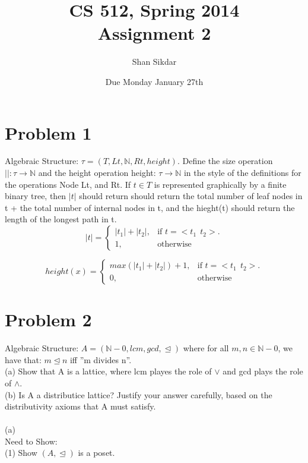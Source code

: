 \documentclass[11pt,leqno,fleqn]{article}
\title{CS 512, Spring 2014
       \\[1ex]
       \textbf{Assignment 2}}
\author{Shan Sikdar}
\date{Due Monday January 27th} %
\begin{document}
\maketitle

\section{Problem 1 }

Algebraic Structure: $\tau = (T, Lt,  \mathbb{N}, Rt, height) $. Define the size operation $|| : \tau \to \mathbb{N} $ and the height operation height: $\tau \to \mathbb{N}$ in the style of the definitions for the operations Node Lt, and Rt.
 If $ t \in T$ is represented graphically by a finite binary tree, then $|t|$ should return should return the total number of leaf nodes in t + the total number of internal nodes in t, and the hieght(t) should return the length of the longest path in t.
\\

 \begin{equation}
  |t|=\begin{cases}
    |t_1| + |t_2|, & \text{if  }  t = <t_1  \ \ t_2>.\\
    1, & \text{otherwise}
  \end{cases}
\end{equation}

 \begin{equation}
  height(x) =\begin{cases}
    max(|t_1| + |t_2|) + 1, & \text{if  }  t = <t_1  \ \ t_2>.\\
    0, & \text{otherwise}
  \end{cases}
\end{equation}

\newpage

\section{Problem 2}

Algebraic Structure: $ A = (\mathbb{N}-{0},lcm,gcd, \trianglelefteq)$ where for all $m,n \in \mathbb{N}-{0}$, we have that: $m \trianglelefteq n$ iff ''m divides n''.\\
(a) Show that A is a lattice, where lcm playes the role of $\lor$ and gcd plays the role of $\land$.\\
(b) Is A a distributice lattice? Justify your answer carefully, based on the distributivity axioms that A must satisfy.\\ 
\\
(a)\\
Need to Show:\\
(1) Show $ (A, \trianglelefteq)$ is a poset.\\
\end{document}
